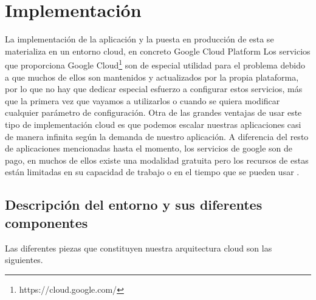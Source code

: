 \cleardoublepage
\mbox{}

\lstset{
language=Python,
basicstyle=\small\sffamily,
numbers=left,
numberstyle=\tiny,
frame=tb,
columns=fullflexible,
showstringspaces=false
}

\chapter{Implementación}
\label{ch:chapter4}
La implementación de la aplicación y la puesta en producción de esta se materializa en un entorno cloud, en concreto Google Cloud Platform
Los servicios que proporciona Google Cloud\footnote{https://cloud.google.com/} son de especial utilidad para el problema debido a que muchos de ellos son mantenidos y actualizados por la propia
plataforma, por lo que no hay que dedicar especial esfuerzo a configurar estos servicios, más que la primera vez que vayamos a utilizarlos o cuando se quiera
modificar cualquier parámetro de configuración.
Otra de las grandes ventajas de usar este tipo de implementación cloud es que podemos escalar nuestras
aplicaciones casi de manera infinita según la demanda de nuestro aplicación.
A diferencia del resto de aplicaciones mencionadas hasta el momento, los servicios de google son de pago, en muchos de ellos existe una modalidad gratuita pero los recursos de estas
están limitadas en su capacidad de trabajo o en el tiempo que se pueden usar .


\section{Descripción del entorno y sus diferentes componentes}\label{sec:descripción-del-entorno-y-sus-diferentes-componentes}
Las diferentes piezas que constituyen nuestra arquitectura cloud son las siguientes.

